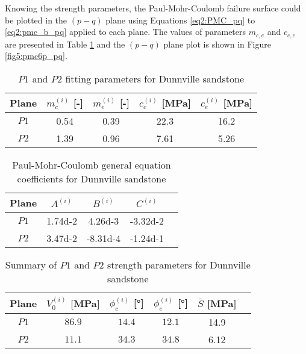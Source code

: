 Knowing the strength parameters, the Paul-Mohr-Coulomb failure surface could be plotted in the $(p-q)$ plane using Equations \ref{eq2:PMC_pq} to \ref{eq2:pmc_b_pq} applied to each plane. The values of parameters $m_{c,e}$ and $c_{c,e}$ are presented in Table \ref{tb5:dunn_pq_para} and the $(p-q)$ plane plot is shown in Figure \ref{fig5:pmc6p_pq}.

\begin{table} [p]
    \centering 
    \begin{tabular}{ccccc}
        \hline 
        Plane & $m_c^{(i)}$ [-] & $m_e^{(i)}$ [-] & $c_c^{(i)}$ [\si{MPa}] & $c_e^{(i)}$ [\si{MPa}] \\
        \hline
        \hline
        $P1$ & 0.54 & 0.39 & 22.3 & 16.2 \\
        $P2$ & 1.39 & 0.96 & 7.61 & 5.26\\
        \hline
    \end{tabular}
    \captionsetup{justification=centering}
    \caption{$P1$ and $P2$ fitting parameters for Dunnville sandstone}
    \label{tb5:dunn_pq_para}
\end{table}

\begin{table} [p]
    \centering 
    \begin{tabular}{ccccc}
        \hline 
        Plane & $A^{(i)}$ & $B^{(i)}$ & $C^{(i)}$ \\
        \hline
        \hline
        $P1$ & \num{1.74d-2} & \num{4.26d-3} & \num{-3.32d-2} \\
        $P2$ & \num{3.47d-2} & \num{-8.31d-4} & \num{-1.24d-1} \\
        \hline
    \end{tabular}
    \captionsetup{justification=centering}
    \caption{Paul-Mohr-Coulomb general equation coefficients for Dunnville sandstone}
    \label{tb5:dunn_abc}
\end{table}

\begin{table} [p]
    \centering 
    \begin{tabular}{cccccc}
        \hline 
        Plane & $V_0^{(i)}$ [\si{MPa}] & $\phi_c^{(i)}$ [\si{\degree}] & $\phi_e^{(i)}$ [\si{\degree}] & $\bar{S}$ [\si{MPa}]\\
        \hline
        \hline
        $P1$ & $86.9$ & $14.4$ & $12.1$ & 14.9\\
        $P2$ & $11.1$ & $34.3$ & $34.8$ & 6.12\\
        \hline
    \end{tabular}
    \captionsetup{justification=centering}
    \caption{Summary of $P1$ and $P2$ strength parameters for Dunnville sandstone}
    \label{tb5:dunn_summary}
\end{table}

